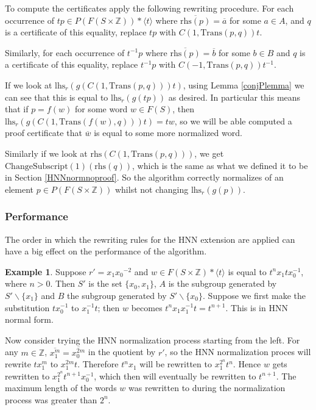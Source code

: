 \documentclass[12pt]{article} %
\theoremstyle{definition}
\theoremstyle{definition}
\theoremstyle{definition}
\theoremstyle{definition}
\newtheorem{exmpl}[thm]{Example}
\begin{document}
To compute the certificates apply the following rewriting procedure.
For each occurrence of
$tp \in P(F(S \times \mathbb{Z})) \ast \langle t \rangle$
where $\overline{\text{rhs}(p)} = \overline{a}$ for
some $a \in A$, and $q$ is a certificate of this equality,
replace $tp$ with $C(1, \text{Trans}(p, q))t$.

Similarly, for each occurrence of $t^{-1}p$ where $\overline{\text{rhs}(p)} = \overline{b}$ for
some $b \in B$ and $q$ is a certificate of this equality,
replace $t^{-1}p$ with $C(-1, \text{Trans}(p, q))t^{-1}$.

If we look at $\text{lhs}_r(g(C(1, \text{Trans}(p, q)))t)$, using Lemma
\ref{conjPlemma} we can see that this is equal to $\text{lhs}_r(g(tp))$ as desired.
In particular this means that if $p = f(w)$ for some word $w \in F(S)$, then
$\text{lhs}_r(g(C(1, \text{Trans}(f(w), q)))t) = tw$, so we will be able
computed a proof certificate that $\overline{w}$ is equal to some more normalized word.

Similarly if we look at $\text{rhs}(C(1, \text{Trans}(p, q)))$, we get
$\text{ChangeSubscript}(1)(\text{rhs}(q))$, which is the same as what we defined
it to be in Section \ref{HNNnormnoproof}. So the algorithm correctly normalizes
 of an element $p \in P(F (S \times \mathbb{Z}))$ whilst not changing
$\text{lhs}_r(g(p))$.

\subsubsection{Performance}\label{HNNperf}

The order in which the rewriting rules for the HNN extension
are applied can have a big effect on the performance
of the algorithm.

\begin{exmpl}\label{ltrbad}
Suppose $r' = {x_1}{x_0}^{-2}$ and
$w \in F(S \times \mathbb{Z}) \ast \langle t \rangle$
is equal to $t^n x_1 t x_0^{-1}$, where $n > 0$.
Then $S'$ is the set $\{x_0, x_1\}$,
$A$ is the subgroup generated by $S' \backslash \{x_1\}$ and
$B$ the subgroup generated by $S' \backslash \{x_0\}$.
Suppose we first make the substitution $tx_0^{-1}$ to $x_1^{-1} t$;
then $w$ becomes $t^{n}x_1x_1^{-1}t = t^{n+1}$.
This is in HNN normal form.

Now consider trying the HNN normalization process starting from the left.
For any $m \in \mathbb{Z}$, $\overline{x_1^m} = \overline{x_0^{2m}}$
in the quotient by $r'$,
so the HNN normalization proces will rewrite $tx_1^m$ to $x_1^{2m}t$.
Therefore $t^nx_1$ will be rewritten to $x_1^{2^n}t^n$.
Hence $w$ gets rewritten to $x_1^{2^n} t^{n+1} x_0^{-1}$,
which then will eventually be rewritten to $t^{n+1}$. The maximum length
of the words $w$ was rewritten to during the normalization process was
greater than $2^n$.
\end{exmpl}
\end{document}
